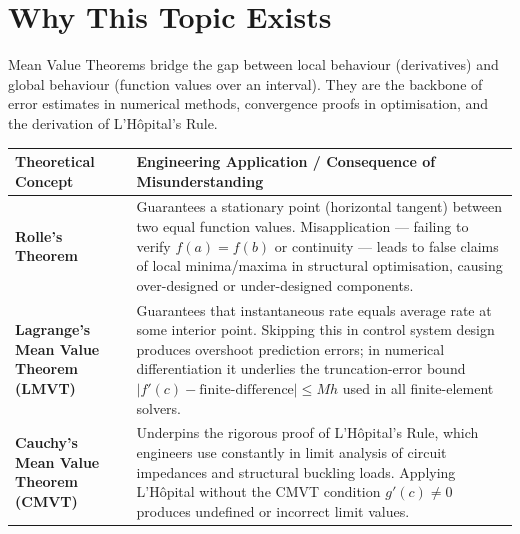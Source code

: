 \documentclass[12pt,a4paper]{article}
\begin{document}
\section{Why This Topic Exists}

Mean Value Theorems bridge the gap between local behaviour (derivatives) and global behaviour
(function values over an interval). They are the backbone of error estimates in numerical methods,
convergence proofs in optimisation, and the derivation of L'H\^{o}pital's Rule.

\begin{center}
\begin{tabular}{>{\bfseries}p{4.2cm} p{9.5cm}}
\toprule
Theoretical Concept & Engineering Application / Consequence of Misunderstanding \\
\midrule
Rolle's Theorem &
  Guarantees a stationary point (horizontal tangent) between two equal function values.
  Misapplication --- failing to verify $f(a)=f(b)$ or continuity --- leads to false claims of
  local minima/maxima in structural optimisation, causing over-designed or under-designed components. \\
\addlinespace
Lagrange's Mean Value Theorem (LMVT) &
  Guarantees that instantaneous rate equals average rate at some interior point.
  Skipping this in control system design produces overshoot prediction errors; in
  numerical differentiation it underlies the truncation-error bound
  $|f'(c) - \text{finite-difference}| \leq Mh$ used in all finite-element solvers. \\
\addlinespace
Cauchy's Mean Value Theorem (CMVT) &
  Underpins the rigorous proof of L'H\^{o}pital's Rule, which engineers use constantly
  in limit analysis of circuit impedances and structural buckling loads. Applying L'H\^{o}pital
  without the CMVT condition $g'(c) \neq 0$ produces undefined or incorrect limit values. \\
\bottomrule
\end{tabular}
\end{center}
\end{document}
